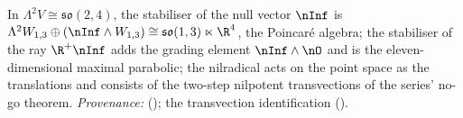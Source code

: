 In $\Lambda^2 V \cong \mathfrak{so}(2,4)$, the stabiliser of the null vector $\nInf$ is $\Lambda^2 W_{1,3} \oplus (\nInf\wedge W_{1,3}) \cong \mathfrak{so}(1,3)\ltimes\R^4$, the Poincar\'e algebra; the stabiliser of the ray $\R^+\nInf$ adds the grading element $\nInf\wedge\nO$ and is the eleven-dimensional maximal parabolic; the nilradical acts on the point space as the translations and consists of the two-step nilpotent transvections of the series' no-go theorem. \emph{Provenance:} \cite[Prop.~4.3]{ButlerT6} (); the transvection identification \cite[Thm.~4.2]{ButlerT1} ().
